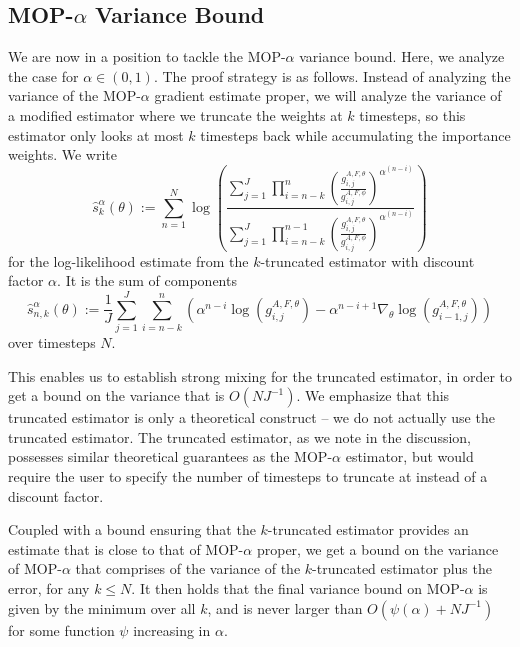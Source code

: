 
\subsection{MOP-$\alpha$ Variance Bound}

We are now in a position to tackle the MOP-$\alpha$ variance bound. Here, we analyze the case for $\alpha \in (0,1)$. The proof strategy is as follows. Instead of analyzing the variance of the MOP-$\alpha$ gradient estimate proper, we will analyze the variance of a modified estimator where we truncate the weights at $k$ timesteps, so this estimator only looks at most $k$ timesteps back while accumulating the importance weights. We write
\begin{equation}
    \hat s_k^\alpha(\theta) := \sum_{n=1}^N \log\left(\frac{\sum_{j=1}^J\prod_{i=n-k}^n\left(\frac{g_{i,j}^{A,F,\theta}}{g_{i,j}^{A,F,\phi}} \right)^{\alpha^{(n-i)}}}{\sum_{j=1}^J\prod_{i=n-k}^{n-1}\left(\frac{g_{i,j}^{A,F,\theta}}{g_{i,j}^{A,F,\phi}} \right)^{\alpha^{(n-i)}}}\right)
\end{equation}
for the log-likelihood estimate from the $k$-truncated estimator with discount factor $\alpha$. It is the sum of components
\begin{equation}
\hat s_{n,k}^\alpha(\theta) := \frac{1}{J}\sum_{j=1}^J\sum_{i=n-k}^n \left(\alpha^{n-i} \log\left(g_{i,j}^{A,F,\theta}\right)- \alpha^{n-i+1} \nabla_\theta \log\left(g_{i-1,j}^{A,F,\theta}\right)\right)
\end{equation} 
over timesteps $N$.

This enables us to establish strong mixing for the truncated estimator, in order to get a bound on the variance that is $O(NJ^{-1})$. We emphasize that this truncated estimator is only a theoretical construct -- we do not actually use the truncated estimator. The truncated estimator, as we note in the discussion, possesses similar theoretical guarantees as the MOP-$\alpha$ estimator, but would require the user to specify the number of timesteps to truncate at instead of a discount factor. 

Coupled with a bound ensuring that the $k$-truncated estimator provides an estimate that is close to that of MOP-$\alpha$ proper, we get a bound on the variance of MOP-$\alpha$ that comprises of the variance of the $k$-truncated estimator plus the error, for any $k \leq N$. It then holds that the final variance bound on MOP-$\alpha$ is given by the minimum over all $k$, and is never larger than $O(\psi(\alpha)+NJ^{-1})$ for some function $\psi$ increasing in $\alpha$. 


